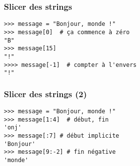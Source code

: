 
\begin{frame}[fragile]
    \frametitle{Slicer des strings}

\begin{lstlisting}
>>> message = "Bonjour, monde !"
>>> message[0]  # ça commence à zéro
"B"
>>> message[15]
"!"
>>>> message[-1]  # compter à l'envers
"!"
\end{lstlisting}
\end{frame}


\begin{frame}[fragile]
    \frametitle{Slicer des strings (2)}

\begin{lstlisting}
>>> message = "Bonjour, monde !"
>>> message[1:4]  # début, fin
'onj'
>>> message[:7] # début implicite
'Bonjour'
>>> message[9:-2] # fin négative
'monde'
\end{lstlisting}
\end{frame}
